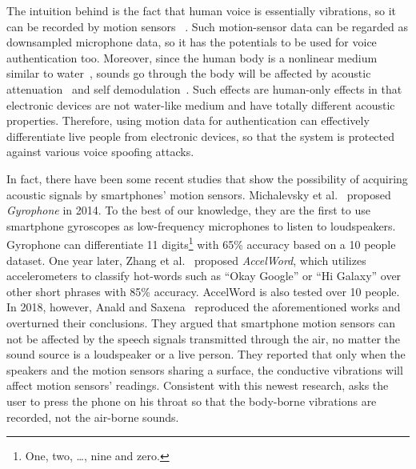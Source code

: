 The intuition behind {\shortname} is the fact that human voice is essentially vibrations, so it can be recorded by motion sensors ~\cite{hopkin2003getting,o2009sonic,michalevsky2014gyrophone}. Such motion-sensor data can be regarded as downsampled microphone data, so it has the potentials to be used for voice authentication too. 
%
Moreover, since the human body is a nonlinear medium similar to water~\cite{kim2014sound}, sounds go through the body will be affected by acoustic attenuation~\cite{szabo1994time} and self demodulation~\cite{berktay1965possible}. Such effects are human-only effects in that electronic devices are not water-like medium and have totally different acoustic properties. Therefore, using motion data for authentication can effectively differentiate live people from electronic devices, so that the system is protected against various voice spoofing attacks.

In fact, there have been some recent studies that show the possibility of acquiring acoustic signals by smartphones' motion sensors. Michalevsky et al.~\cite{michalevsky2014gyrophone} proposed \textit{Gyrophone} in 2014. To the best of our knowledge, they are the first to use smartphone gyroscopes as low-frequency microphones to listen to loudspeakers. Gyrophone can differentiate 11 digits\footnote{One, two, \ldots, nine and zero.} with 65\% accuracy based on a 10 people dataset.
%
One year later, Zhang et al.~\cite{zhang2015accelword} proposed \textit{AccelWord}, which utilizes accelerometers to classify hot-words such as ``Okay Google'' or ``Hi Galaxy'' over other short phrases with 85\% accuracy. AccelWord is also tested over 10 people.
%
In 2018, however, Anald and Saxena~\cite{anand2018speechless} reproduced the aforementioned works and overturned their conclusions. They argued that smartphone motion sensors can not be affected by the speech signals transmitted through the air, no matter the sound source is a loudspeaker or a live person. They reported that only when the speakers and the motion sensors sharing a surface, the conductive vibrations will affect motion sensors' readings. Consistent with this newest research, {\shortname} asks the user to press the phone on his throat so that the body-borne vibrations are recorded, not the air-borne sounds.




